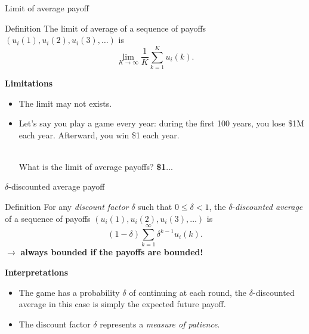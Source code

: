 \begin{frame}{Limit of average payoff}
    \begin{block}{Definition}
        The limit of average of a sequence of payoffs $(u_i(1), u_i(2), u_i(3), \dots)$ is
        \[ \lim_{K\to\infty} \frac{1}{K} \sum_{k=1}^K u_i(k). \]
    \end{block}
    
    \textbf{{\color{orange}Limitations}}\\
    \pause
    \begin{itemize}
        \item The limit may not exists. \pause
        \item Let's say you play a game every year: during the first 100 years, you lose \$1M
        each year. Afterward, you win \$1 each year.\\\
            
        What is the limit of average payoffs? \pause \textbf{{\color{orange}\$1}}...
    \end{itemize}
\end{frame}


\begin{frame}{$\delta$-discounted average payoff}
    \begin{block}{Definition}
        For any \textit{discount factor} $\delta$ such that $0 \le \delta < 1$, the $\delta$-\textit{discounted
        average} of a sequence of payoffs $(u_i(1), u_i(2), u_i(3), \dots)$ is
        \[ (1-\delta)\sum_{k=1}^{\infty} \delta^{k-1}u_i(k). \]
        $\to$ \textbf{always bounded if the payoffs are bounded!}
    \end{block}

    \textbf{{\color{green}Interpretations}}\\
    \pause
    \begin{itemize}
        \item The game has a probability $\delta$ of continuing at each round, the $\delta$-discounted
        average in this case is simply the expected future payoff. \pause
        \item The discount factor $\delta$ represents a \textit{measure of patience}.
    \end{itemize}
\end{frame}

